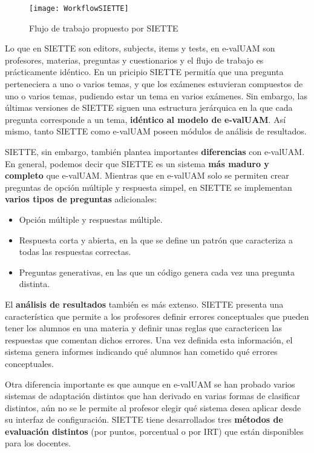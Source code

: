 \begin{figure}[htp!]
	\centering
	\texttt{[image: WorkflowSIETTE]}
	\caption{Flujo de trabajo propuesto por SIETTE\cite{SIETTEWiki}}
	\label{fig:SIETTE workflow}
\end{figure}

Lo que en SIETTE son editors, subjects, items y tests, en e-valUAM son profesores, materias, preguntas y cuestionarios y el flujo de trabajo es prácticamente idéntico. En un pricipio SIETTE permitía que una pregunta perteneciera a uno o varios temas, y que los exámenes estuvieran compuestos de uno o varios temas, pudiendo estar un tema en varios exámenes\cite{Conejo04}. Sin embargo, las últimas versiones de SIETTE siguen una estructura jerárquica en la que cada pregunta corresponde a un tema, \textbf{idéntico al modelo de e-valUAM}. Así mismo, tanto SIETTE como e-valUAM poseen módulos de análisis de resultados. 

SIETTE, sin embargo, también plantea importantes \textbf{diferencias} con e-valUAM. En general, podemos decir que SIETTE es un sistema \textbf{más maduro y completo} que e-valUAM. Mientras que en e-valUAM solo se permiten crear preguntas de opción múltiple y respuesta simpel, en SIETTE se implementan \textbf{varios tipos de preguntas} adicionales:

\begin{itemize}
	\item Opción múltiple y respuestas múltiple.
	\item Respuesta corta y abierta, en la que se define un patrón que caracteriza a todas las respuestas correctas.
	\item Preguntas generativas, en las que un código genera cada vez una pregunta distinta.
\end{itemize}

El \textbf{análisis de resultados} también es más extenso. SIETTE presenta una característica que permite a los profesores definir errores conceptuales que pueden tener los alumnos en una materia y definir unas reglas que caractericen las respuestas que comentan dichos errores. Una vez definida esta información, el sistema genera informes indicando qué alumnos han cometido qué errores conceptuales.

Otra diferencia importante es que aunque en e-valUAM se han probado varios sistemas de adaptación distintos que han derivado en varias formas de clasificar distintos, aún no se le permite al profesor elegir qué sistema desea aplicar desde su interfaz de configuración. SIETTE tiene desarrollados tres \textbf{métodos de evaluación distintos} (por puntos, porcentual o por \acrshort{IRT}) que están disponibles para los docentes.

